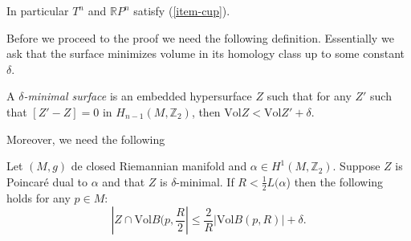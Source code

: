 \noindent
In particular $T^n$ and $\mathbb{R}P^n$ satisfy (\ref{item-cup}).

Before we proceed to the proof we need the following definition.
Essentially we ask that the surface minimizes volume in its homology
class up to some constant $\delta$.

\begin{definition}
\label{definition-delta-minimal-surface}
A  {\it $\delta$-minimal surface} is an embedded hypersurface $Z$
such that for any $Z'$ such that $[Z'-Z] = 0$ in  $H_{n-1}(M,\mathbb{Z}_2)$,
then  $\text{Vol}Z < \text{Vol}Z'+\delta$.
\end{definition}

\noindent
Moreover, we need the following

\begin{lemma}[Stability]
\label{lemma-stability}
Let $(M,g)$ de closed Riemannian manifold and  $\alpha \in H^1(M,\mathbb{Z}_2)$.
Suppose $Z$ is Poincaré dual to $\alpha$ and that $Z$ is $\delta$-minimal.
If $R<\frac{1}{2}L(\alpha$) then the following
holds for any $p \in M$:
$$
|Z \cap \text{Vol}B(p,\frac{R}{2}|\leq \frac{2}{R}|\text{Vol}B(p,R)|+\delta.
$$ 
\end{lemma}

